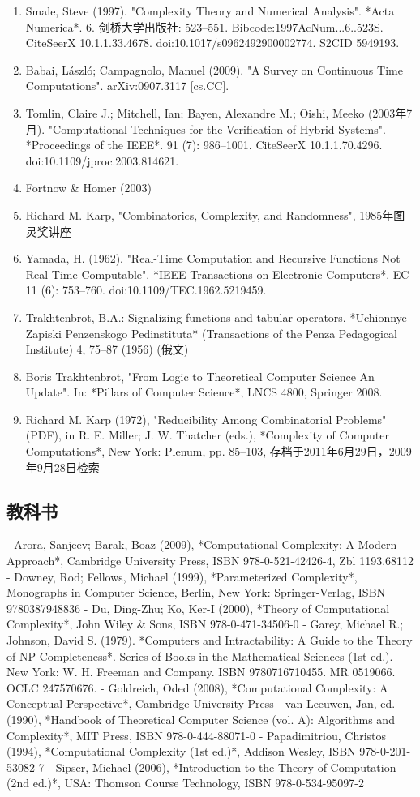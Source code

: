 \begin{enumerate}
\item Smale, Steve (1997). "Complexity Theory and Numerical Analysis". *Acta Numerica*. 6. 剑桥大学出版社: 523–551. Bibcode:1997AcNum...6..523S. CiteSeerX 10.1.1.33.4678. doi:10.1017/s0962492900002774. S2CID 5949193.
\item Babai, László; Campagnolo, Manuel (2009). "A Survey on Continuous Time Computations". arXiv:0907.3117 [cs.CC].
\item Tomlin, Claire J.; Mitchell, Ian; Bayen, Alexandre M.; Oishi, Meeko (2003年7月). "Computational Techniques for the Verification of Hybrid Systems". *Proceedings of the IEEE*. 91 (7): 986–1001. CiteSeerX 10.1.1.70.4296. doi:10.1109/jproc.2003.814621.
\item Fortnow & Homer (2003)
\item Richard M. Karp, "Combinatorics, Complexity, and Randomness", 1985年图灵奖讲座
\item Yamada, H. (1962). "Real-Time Computation and Recursive Functions Not Real-Time Computable". *IEEE Transactions on Electronic Computers*. EC-11 (6): 753–760. doi:10.1109/TEC.1962.5219459.
\item Trakhtenbrot, B.A.: Signalizing functions and tabular operators. *Uchionnye Zapiski Penzenskogo Pedinstituta* (Transactions of the Penza Pedagogical Institute) 4, 75–87 (1956) (俄文)
\item Boris Trakhtenbrot, "From Logic to Theoretical Computer Science An Update". In: *Pillars of Computer Science*, LNCS 4800, Springer 2008.
\item Richard M. Karp (1972), "Reducibility Among Combinatorial Problems" (PDF), in R. E. Miller; J. W. Thatcher (eds.), *Complexity of Computer Computations*, New York: Plenum, pp. 85–103, 存档于2011年6月29日，2009年9月28日检索
\end{enumerate}
\subsection{教科书}

- Arora, Sanjeev; Barak, Boaz (2009), *Computational Complexity: A Modern Approach*, Cambridge University Press, ISBN 978-0-521-42426-4, Zbl 1193.68112
- Downey, Rod; Fellows, Michael (1999), *Parameterized Complexity*, Monographs in Computer Science, Berlin, New York: Springer-Verlag, ISBN 9780387948836
- Du, Ding-Zhu; Ko, Ker-I (2000), *Theory of Computational Complexity*, John Wiley & Sons, ISBN 978-0-471-34506-0
- Garey, Michael R.; Johnson, David S. (1979). *Computers and Intractability: A Guide to the Theory of NP-Completeness*. Series of Books in the Mathematical Sciences (1st ed.). New York: W. H. Freeman and Company. ISBN 9780716710455. MR 0519066. OCLC 247570676.
- Goldreich, Oded (2008), *Computational Complexity: A Conceptual Perspective*, Cambridge University Press
- van Leeuwen, Jan, ed. (1990), *Handbook of Theoretical Computer Science (vol. A): Algorithms and Complexity*, MIT Press, ISBN 978-0-444-88071-0
- Papadimitriou, Christos (1994), *Computational Complexity (1st ed.)*, Addison Wesley, ISBN 978-0-201-53082-7
- Sipser, Michael (2006), *Introduction to the Theory of Computation (2nd ed.)*, USA: Thomson Course Technology, ISBN 978-0-534-95097-2

